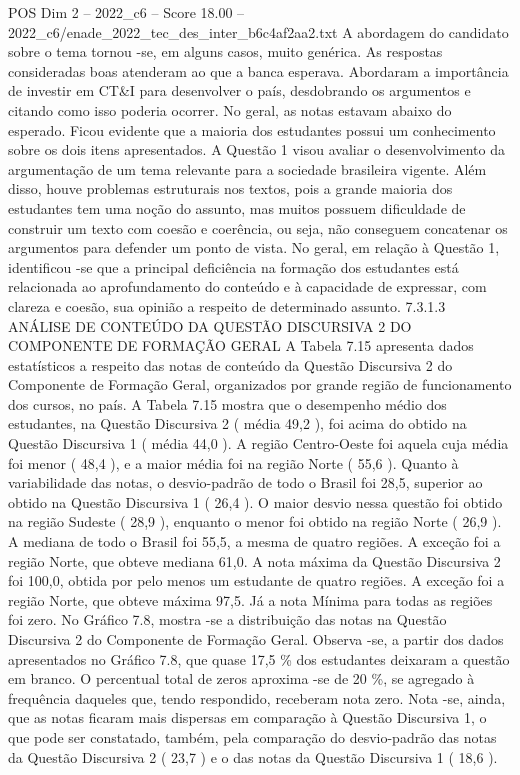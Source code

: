\begin{textsample}{POS Dim 2 – 2022\_c6 – Score 18.00 – 2022\_c6/enade\_2022\_tec\_des\_inter\_b6c4af2aa2.txt}
A abordagem do candidato sobre o tema tornou -se, em alguns casos, muito genérica.
As respostas consideradas boas atenderam ao que a banca esperava.
Abordaram a importância de investir em CT\&I para desenvolver o país, desdobrando os argumentos e citando como isso poderia ocorrer.
No geral, as notas estavam abaixo do esperado.
Ficou evidente que a maioria dos estudantes possui um conhecimento sobre os dois itens apresentados.
A Questão 1 visou avaliar o desenvolvimento da argumentação de um tema relevante para a sociedade brasileira vigente.
Além disso, houve problemas estruturais nos textos, pois a grande maioria dos estudantes tem uma noção do assunto, mas muitos possuem dificuldade de construir um texto com coesão e coerência, ou seja, não conseguem concatenar os argumentos para defender um ponto de vista.
No geral, em relação à Questão 1, identificou -se que a principal deficiência na formação dos estudantes está relacionada ao aprofundamento do conteúdo e à capacidade de expressar, com clareza e coesão, sua opinião a respeito de determinado assunto. 7.3.1.3 ANÁLISE DE CONTEÚDO DA QUESTÃO DISCURSIVA 2 DO COMPONENTE DE FORMAÇÃO GERAL A Tabela 7.15 apresenta dados estatísticos a respeito das notas de conteúdo da Questão Discursiva 2 do Componente de Formação Geral, organizados por grande região de funcionamento dos cursos, no país.
A Tabela 7.15 mostra que o desempenho médio dos estudantes, na Questão Discursiva 2 ( média 49,2 ), foi acima do obtido na Questão Discursiva 1 ( média 44,0 ).
A região Centro-Oeste foi aquela cuja média foi menor ( 48,4 ), e a maior média foi na região Norte ( 55,6 ).
Quanto à variabilidade das notas, o desvio-padrão de todo o Brasil foi 28,5, superior ao obtido na Questão Discursiva 1 ( 26,4 ).
O maior desvio nessa questão foi obtido na região Sudeste ( 28,9 ), enquanto o menor foi obtido na região Norte ( 26,9 ).
A mediana de todo o Brasil foi 55,5, a mesma de quatro regiões.
A exceção foi a região Norte, que obteve mediana 61,0.
A nota máxima da Questão Discursiva 2 foi 100,0, obtida por pelo menos um estudante de quatro regiões.
A exceção foi a região Norte, que obteve máxima 97,5.
Já a nota Mínima para todas as regiões foi zero.
No Gráfico 7.8, mostra -se a distribuição das notas na Questão Discursiva 2 do Componente de Formação Geral.
Observa -se, a partir dos dados apresentados no Gráfico 7.8, que quase 17,5 \% dos estudantes deixaram a questão em branco.
O percentual total de zeros aproxima -se de 20 \%, se agregado à frequência daqueles que, tendo respondido, receberam nota zero.
Nota -se, ainda, que as notas ficaram mais dispersas em comparação à Questão Discursiva 1, o que pode ser constatado, também, pela comparação do desvio-padrão das notas da Questão Discursiva 2 ( 23,7 ) e o das notas da Questão Discursiva 1 ( 18,6 ).

\end{textsample}
